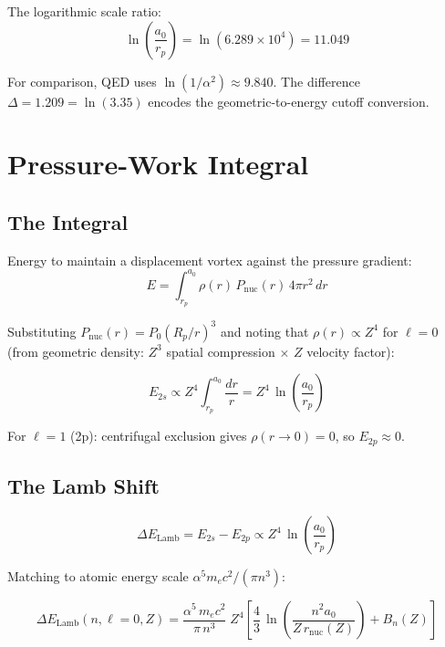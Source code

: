 The logarithmic scale ratio:
\begin{equation}
  \ln\!\left(\frac{a_0}{r_p}\right) = \ln(6.289 \times 10^4) = 11.049
\end{equation}

For comparison, QED uses $\ln(1/\alpha^2) \approx 9.840$.  The difference $\Delta = 1.209 = \ln(3.35)$ encodes the geometric-to-energy cutoff conversion.


\section{Pressure-Work Integral}

\subsection{The Integral}

Energy to maintain a displacement vortex against the pressure gradient:
\begin{equation}
  E = \int_{r_p}^{a_0} \rho(r)\,P_{\text{nuc}}(r)\,4\pi r^2\,dr
\end{equation}

Substituting $P_{\text{nuc}}(r) = P_0(R_p/r)^3$ and noting that $\rho(r) \propto Z^4$ for $\ell = 0$ (from geometric density: $Z^3$ spatial compression $\times$ $Z$ velocity factor):

\begin{equation}
  E_{2s} \propto Z^4 \int_{r_p}^{a_0} \frac{dr}{r} = Z^4\,\ln\!\left(\frac{a_0}{r_p}\right)
\end{equation}

For $\ell = 1$ (2p): centrifugal exclusion gives $\rho(r \to 0) = 0$, so $E_{2p} \approx 0$.

\subsection{The Lamb Shift}

\begin{equation}
  \Delta E_{\text{Lamb}} = E_{2s} - E_{2p} \propto Z^4\,\ln\!\left(\frac{a_0}{r_p}\right)
\end{equation}

Matching to atomic energy scale $\alpha^5 m_e c^2/(\pi n^3)$:

\begin{equation}\label{eq:lamb-master}
  \boxed{
    \Delta E_{\text{Lamb}}(n, \ell{=}0, Z) = \frac{\alpha^5\,m_e c^2}{\pi\,n^3}\;Z^4
      \left[\frac{4}{3}\,\ln\!\left(\frac{n^2 a_0}{Z\,r_{\text{nuc}}(Z)}\right) + B_n(Z)\right]
  }
\end{equation}

